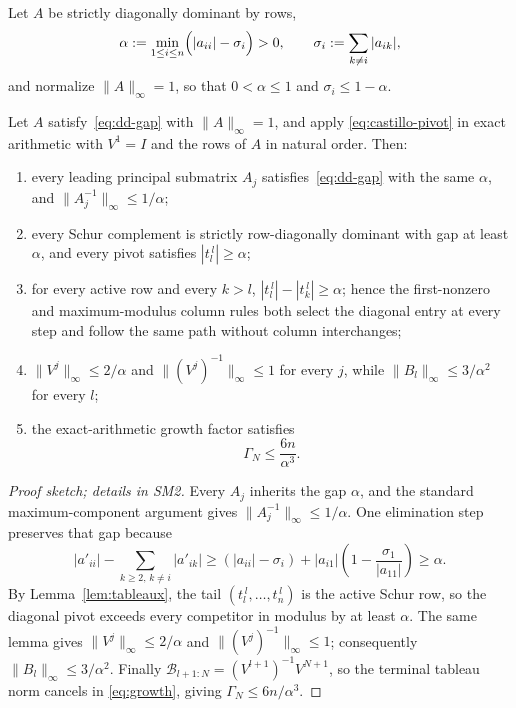 \documentclass[review,onefignum,onetabnum]{siamart251216}
\begin{document}
Let $A$ be strictly diagonally dominant by rows,
%
\begin{equation}\label{eq:dd-gap}
\alpha := \min_{1\le i\le n}\Bigl(|a_{ii}|-\sigma_i\Bigr) > 0,
\qquad
\sigma_i := \sum_{k\ne i}|a_{ik}| ,
\end{equation}
%
and normalize $\|A\|_\infty=1$, so that $0<\alpha\le1$ and $\sigma_i\le1-\alpha$.

\begin{theorem}\label{thm:dd}
Let $A$ satisfy~\eqref{eq:dd-gap} with $\|A\|_\infty=1$, and apply
\eqref{eq:castillo-pivot} in exact arithmetic with $V^1=I$ and the rows of $A$ in natural order.
Then:
\begin{enumerate}
\item every leading principal submatrix $A_j$ satisfies~\eqref{eq:dd-gap} with the same $\alpha$,
and $\|A_j^{-1}\|_\infty\le1/\alpha$;
\item every Schur complement is strictly row-diagonally dominant with gap at least $\alpha$, and
every pivot satisfies $|t_l^{\,l}|\ge\alpha$;
\item for every active row and every $k>l$,
$|t_l^{\,l}|-|t_k^{\,l}|\ge\alpha$; hence the first-nonzero and maximum-modulus column rules both
select the diagonal entry at every step and follow the same path without column interchanges;
\item $\|V^j\|_\infty\le2/\alpha$ and $\|(V^j)^{-1}\|_\infty\le1$ for every $j$, while
$\|B_l\|_\infty\le3/\alpha^2$ for every $l$;
\item the exact-arithmetic growth factor satisfies
%
\begin{equation}\label{eq:dd-growth}
\Gamma_N\le\frac{6n}{\alpha^3}.
\end{equation}
\end{enumerate}
\end{theorem}

\begin{proof}[Proof sketch; details in SM2]
Every $A_j$ inherits the gap $\alpha$, and the standard maximum-component argument gives
$\|A_j^{-1}\|_\infty\le1/\alpha$.  One elimination step preserves that gap because
\[
|a'_{ii}|-\sum_{k\ge2,\,k\ne i}|a'_{ik}|
\ge (|a_{ii}|-\sigma_i)
+|a_{i1}|\left(1-\frac{\sigma_1}{|a_{11}|}\right)\ge\alpha.
\]
By Lemma~\ref{lem:tableaux}, the tail $(t_l^{\,l},\ldots,t_n^{\,l})$ is the active Schur row,
so the diagonal pivot exceeds every competitor in modulus by at least $\alpha$.  The same lemma
gives $\|V^j\|_\infty\le2/\alpha$ and $\|(V^j)^{-1}\|_\infty\le1$; consequently
$\|B_l\|_\infty\le3/\alpha^2$.  Finally
$\mathcal B_{l+1:N}=(V^{l+1})^{-1}V^{N+1}$, so the terminal tableau norm cancels in
\eqref{eq:growth}, giving $\Gamma_N\le6n/\alpha^3$.
\end{proof}
\end{document}
